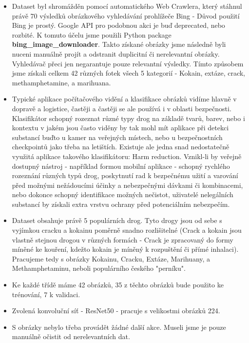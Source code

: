 \documentclass[a4paper]{article}
\newenvironment{ukol}[2][]{\begin{trivlist} 
\item[\hskip \labelsep {\bfseries #1}\hskip \labelsep {\bfseries #2}]}{\end{trivlist}}
\begin{document}
\begin{ukol}{Dataset}
\begin{itemize}
	\item Dataset byl shromážděn pomocí automatického Web Crawlera, který stáhnul právě 70 výsledků obrázkového vyhledávání prohlížeče Bing - Důvod použití Bing je prostý. Google API pro podobnou akci je buď deprecated, nebo rozbité. K tomuto účelu jsme použili Python package \textbf{bing\_image\_downloader}. Takto získané obrázky jsme následně byli nuceni manuálně projít a odstranit duplicitní či nerelevantní obrázky. Vyhledávač přeci jen negarantuje pouze relevantní výsledky. Tímto způsobem jsme získali celkem 42 různých fotek všech 5 kategorií - Kokain, extáze, crack, methamphetamine, a marihuana.
	\item Typické aplikace počítačového vidění a klasifikace obrázků vidíme hlavně v dopravě a logistice, častěji a častěji se ale používá i v oblasti bezpečnosti. Klasifikátor schopný rozeznat různé typy drog na základě tvarů, barev, nebo i kontextu v jakém jsou často viděny by tak mohl mít aplikace při detekci substancí buďto u kamer na veřejných místech, nebo u bezpečnostních checkpointů jako třeba na letištích. Existuje ale jedna snad nedostatečně využitá aplikace takového klasifikátoru: Harm reduction. Vznikl-li by veřejně dostupný nástroj - například formou mobilní aplikace - schopný rychlého rozeznání různých typů drog, poskytnutí rad k bezpečnému užití a varování před možnými nežádoucími účinky a nebezpečnými dávkami či kombinacemi, nebo dokonce schopný identifikace možných nečistot, uživatelé nelegálních substancí by získali extra vrstvu ochrany před potenciálním nebezpečím.
	\item Dataset obsahuje právě 5 populárních drog. Tyto drogy jsou od sebe s vyjímkou cracku a kokainu poměrně snadno rozlišitelné (Crack a kokain jsou vlastně stejnou drogou v různých formách - Crack je zpracovaný do formy míněné ke kouření, kdežto kokain je míněný k rozpuštění či přímé inhalaci). Pracujeme tedy s obrázky Kokainu, Cracku, Extáze, Marihuany, a Methamphetaminu, neboli populárního českého "perníku".
	\item Ke každé třídě máme 42 obrázků, 35 z těchto obrázků bude použito ke trénování, 7 k validaci.
	\item Zvolená konvoluční síť - ResNet50 - pracuje s velikostmi obrázků 224.
	\item S obrázky nebylo třeba provádět žádné další akce. Museli jsme je pouze manuálně očistit od nerelevantních dat.
\end{itemize}

\end{ukol}
\end{document}
